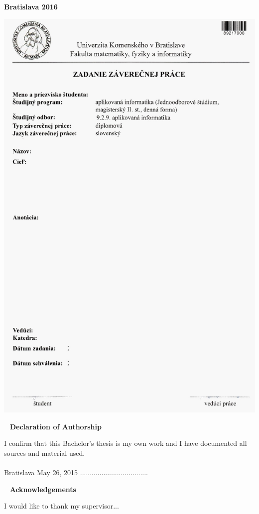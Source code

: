 
\vfill
\noindent
{\bf Bratislava 2016}  \hfill {\bf \autor}
\thispagestyle{empty}

\newpage
\thispagestyle{empty}
\vspace*{-35px}\hspace*{-30px}
\includegraphics[scale=2.0]{pics/zadanie.jpg}

\newpage
{~}\vfill
{\noindent \large\bf Declaration of Authorship} 
\vspace{1.5cm}

I confirm that this Bachelor’s thesis is my own work and I have documented all sources and material used.\\\\ 
Bratislava May 26, 2015
\hfill ................................... 
\vspace{1cm}

\newpage
{~}\vfill
{\noindent\large\bf Acknowledgements} 
\vspace{1.5cm}

I would like to thank my supervisor...  \\
\vspace{1cm}

\newpage

